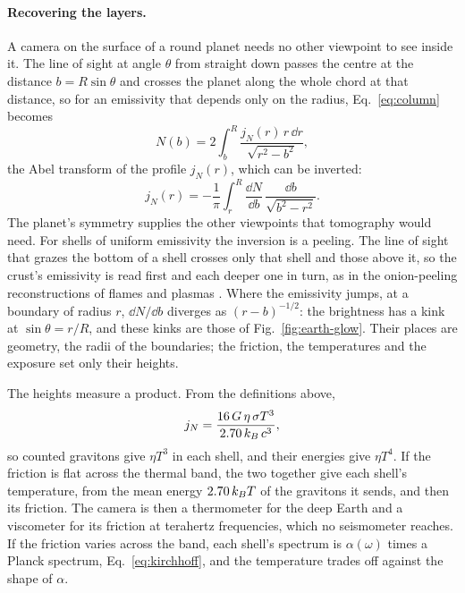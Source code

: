 \paragraph{Recovering the layers.} A camera on the surface of a round planet
needs no other viewpoint to see inside it. The line of sight at angle $\theta$
from straight down passes the centre at the distance $b = R\sin\theta$ and
crosses the planet along the whole chord at that distance, so for an emissivity
that depends only on the radius, Eq.~\eqref{eq:column} becomes
\begin{equation}\label{eq:abel}
N(b) = 2\int_b^R \frac{j_N(r)\,r\,\dd r}{\sqrt{r^2 - b^2}} ,
\end{equation}
the Abel transform of the profile $j_N(r)$, which can be inverted:
\begin{equation}\label{eq:abel-inverse}
j_N(r) = -\frac{1}{\pi}\int_r^R \frac{\dd N}{\dd b}\,\frac{\dd b}{\sqrt{b^2 - r^2}} .
\end{equation}
The planet's symmetry supplies the other viewpoints that tomography would need.
For shells of uniform emissivity the inversion is a peeling. The line of sight
that grazes the bottom of a shell crosses only that shell and those above it, so
the crust's emissivity is read first and each deeper one in turn, as in the
onion-peeling reconstructions of flames and plasmas \cite{Dasch1992}. Where the
emissivity jumps, at a boundary of radius $r$, $\dd N/\dd b$ diverges as
$(r - b)^{-1/2}$: the brightness has a kink at $\sin\theta = r/R$, and these
kinks are those of Fig.~\ref{fig:earth-glow}. Their places are geometry,
the radii of the boundaries; the friction, the temperatures and the exposure set
only their heights.

The heights measure a product. From the definitions above,
\begin{equation}\label{eq:jN-friction}
j_N = \frac{16\,G\,\eta\,\sigma T^3}{2.70\,k_B\,c^3} ,
\end{equation}
so counted gravitons give $\eta T^3$ in each shell, and their energies give
$\eta T^4$. If the friction is flat across the thermal band, the two together
give each shell's temperature, from the mean energy $2.70\,k_B T$ of the
gravitons it sends, and then its friction. The camera is then a thermometer for
the deep Earth and a viscometer for its friction at terahertz frequencies, which
no seismometer reaches. If the friction varies across the band, each shell's
spectrum is $\alpha(\omega)$ times a Planck spectrum, Eq.~\eqref{eq:kirchhoff},
and the temperature trades off against the shape of $\alpha$.

